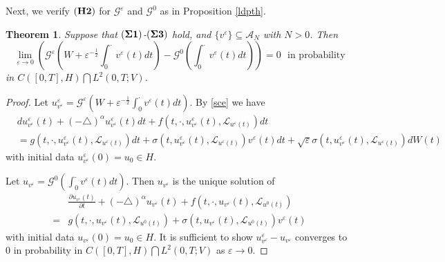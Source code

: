 \documentclass[11pt]{article}
\numberwithin{equation}{section}
\theoremstyle{plain}
\newtheorem{theorem}{Theorem}[section]
\begin{document}
 Next, we verify
 $({\bf H2})$ for
 $\mathcal{G} ^\varepsilon$ and $\mathcal{G}^0$
 as
 in Proposition \ref{ldpth}.



 \begin{theorem}\label{h2}
    Suppose that $({\bf \Sigma 1})$-$({\bf \Sigma 3})$ hold,
    and $\{ v^\varepsilon \} \subseteq \mathcal{A}_N$ with $ N>0 $.
    Then
    $$
    \lim_{\varepsilon \to 0}
    \left ( \mathcal{G}^\varepsilon
    \left( W + \varepsilon^{-\frac{1}{2}}
    \int_{0}^{\cdot} v^\varepsilon(t) dt
    \right)
    - \mathcal{G}^0
    \left( \int_{0}^{\cdot} v^\varepsilon(t) dt
    \right)
    \right ) = 0
    \ \ \  \text{in probability}
    $$
    in $C([0,T], H) \bigcap L^2(0,T; V)$.
 \end{theorem}

 \begin{proof}
    Let $u_{v^\varepsilon}^\varepsilon
    = \mathcal{G}^\varepsilon
    \left( W + \varepsilon^{-\frac{1}{2}} \int_{0}^{\cdot} v^\varepsilon(t) dt
    \right)$.
    By \eqref{sce} we have
    \begin{align} \label{h2-1}
        & d u_{v^\varepsilon}^\varepsilon (t)
        + (-\triangle)^\alpha u_{v^\varepsilon}^\varepsilon (t) dt
        + f(t, \cdot, u_{v^\varepsilon}^\varepsilon(t), \mathcal{L}_{u^\varepsilon(t)} ) dt
        \\
        & = g(t, \cdot, u_{v^\varepsilon}^\varepsilon(t), \mathcal{L}_{u^\varepsilon(t)} ) dt
        + \sigma(t, u_{v^\varepsilon}^\varepsilon (t), \mathcal{L}_{u^\varepsilon(t)} ) v^\varepsilon(t) dt
        + \sqrt{\varepsilon} \sigma(t, u_{v^\varepsilon}^\varepsilon(t), \mathcal{L}_{u^\varepsilon(t)} ) dW(t)
    \end{align}
    with initial data
    $u_{v^\varepsilon}^\varepsilon(0) = u_0 \in H$.

    Let $u_{v^\varepsilon}
    = \mathcal{G}^0 \left( \int_{0}^{\cdot} v^\varepsilon(t) dt \right)$.
    Then $u_{v^\varepsilon}$ is the unique solution of
    \begin{align} \label{h2-2}
        & \frac{\partial u_{v^\varepsilon} (t)}{\partial t}
        + (-\triangle)^\alpha u_{v^\varepsilon} (t)
        + f(t, \cdot,  u_{v^\varepsilon}(t), \mathcal{L}_{u^0(t)} )
        \nonumber \\
        = & g(t, \cdot, u_{v^\varepsilon}(t), \mathcal{L}_{u^0(t)} )
        + \sigma(t, u_{v^\varepsilon}(t), \mathcal{L}_{u^0(t)}) v^\varepsilon(t)
    \end{align}
    with initial data
    $u_{v^\varepsilon}(0) = u_0 \in H$.
    It  is sufficient to show
    $ u_{v^\varepsilon}^\varepsilon - u_{v^\varepsilon}$
    converges to $0$
    in probability  in
    $C([0,T], H) \bigcap L^2(0,T; V)$
    as $\varepsilon \rightarrow 0$.


\end{proof}
\end{document}
